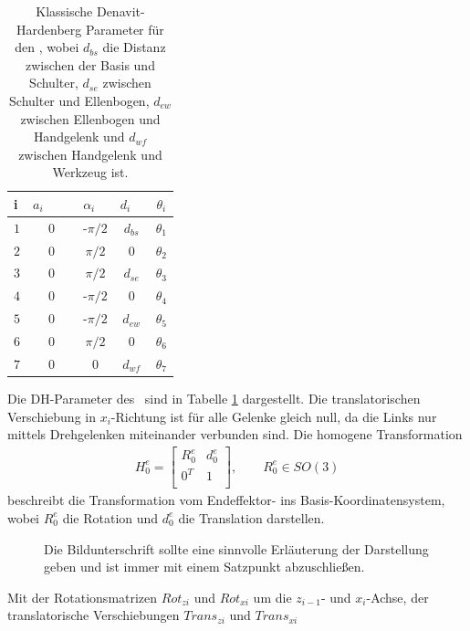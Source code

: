 \begin{table}[htb]
\centering
	\begin{tabular}{lcccc}\toprule
		i &$a_i$ \ \ \  	&$\alpha_i$ \ &$d_i$ \ &$\theta_i$	\\
		\midrule
	   $1$	&$0$		 &-$\pi/2$	& $d_{bs}$  	&$\theta_1$  \\
	   $2$	&$0$		 &$\pi/2$	& $0 $	        &$\theta_2$  \\
	   $3$	&$0$		 &$\pi/2$	& $d_{se}$  	&$\theta_3$  \\
	   $4$	&$0$		 &-$\pi/2$	& $0$	        &$\theta_4$  \\
	   $5$	&$0$		 &-$\pi/2$	& $d_{ew}$    	&$\theta_5$  \\
	   $6$	&$0$		 &$\pi/2$	& $0$	        &$\theta_6$  \\
	   $7$	&$0$		 &$0$	        & $d_{wf}$   	&$\theta_7$  \\ \bottomrule

	\end{tabular}
	\caption{Klassische Denavit-Hardenberg Parameter für den \kuka, wobei $d_{bs}$ die Distanz zwischen der Basis und Schulter, $d_{se}$ zwischen Schulter und Ellenbogen, $d_{ew}$ zwischen Ellenbogen und Handgelenk und $d_{wf}$ zwischen Handgelenk und Werkzeug ist.}
		\label{tab:DH_Parameter}
	\end{table}
 Die DH-Parameter des \kuka \ sind in Tabelle \ref{tab:DH_Parameter} dargestellt. Die translatorischen Verschiebung in $x_i$-Richtung ist für alle Gelenke gleich null, da die Links nur mittels Drehgelenken miteinander verbunden sind. Die homogene Transformation 
\begin{align}
H_0^e = 
\begin{bmatrix}
R_0^e & d_0^e \\
0^T & 1 \\
\end{bmatrix}, \qquad  R_0^e \in SO(3)
\end{align}
beschreibt die Transformation vom Endeffektor- ins Basis-Koordinatensystem, wobei $R_0^e$ die Rotation und $d_0^e$ die Translation darstellen.
\begin{figure}[h]
	\centering
	
	\caption{Die Bildunterschrift sollte eine sinnvolle Erläuterung der
		Darstellung geben und ist immer mit einem Satzpunkt abzuschließen.}
	\label{fig:Koordinaten_trans}
\end{figure}
Mit der Rotationsmatrizen $Rot_{zi}$ und $Rot_{xi}$ um die $z_{i-1}$-  und $x_{i}$-Achse, der translatorische Verschiebungen $Trans_{zi}$ und $Trans_{xi}$

